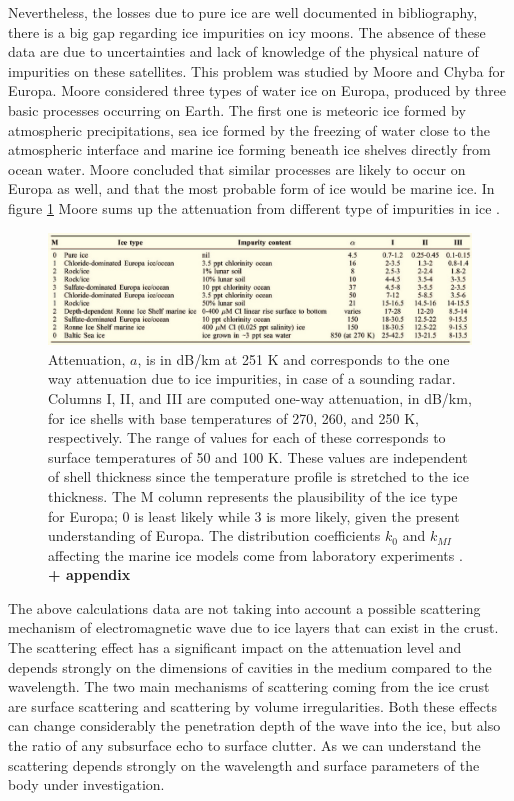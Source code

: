 Nevertheless, the losses due to pure ice are well documented in bibliography, there is a big gap regarding ice impurities on icy moons. The absence of these data are due to uncertainties and lack of knowledge of the physical nature of impurities on these satellites. This problem was studied by  Moore \cite{Moore_2000} and Chyba \cite{Chyba_1998} for Europa. Moore considered three types of water ice on Europa, produced by three basic processes occurring on Earth. The first one is meteoric ice formed by atmospheric precipitations, sea ice formed by the freezing of water close to the atmospheric interface and marine ice forming beneath ice shelves directly from ocean water. Moore concluded that similar processes are likely to occur on Europa as well, and that the most probable form of ice would be marine ice. In figure \ref{impurities} Moore sums up the attenuation from different type of impurities in ice \cite{Moore_2000}.

\begin{figure}[ht]
\centering
\label{impurities}
\includegraphics[width=1\textwidth]{figures/Moore2.jpg}
\caption{Attenuation, $a$, is in dB/km at 251 K and corresponds to the one way attenuation due to  ice impurities, in case of a sounding radar. Columns I, II, and III are computed one-way attenuation, in dB/km, for ice shells with base temperatures of 270, 260, and 250 K, respectively. The range of values for each of these corresponds to surface temperatures of 50 and 100 K. These values are independent of shell thickness since the temperature profile is stretched to the ice thickness. The M column represents the plausibility of the ice type for Europa; 0 is least likely while 3 is more likely, given the present understanding
of Europa. The distribution coefficients $k_{0}$ and $k_{MI}$ affecting the marine ice models come from laboratory experiments \cite{Moore_2000}. \textbf{+ appendix}}
\end{figure}
The above calculations data are not taking into account a possible scattering mechanism of electromagnetic wave due to ice layers that can exist in the crust. The scattering effect has a significant impact on the attenuation level and depends strongly on the dimensions of cavities in the medium compared to the wavelength. The two main mechanisms of scattering coming from the ice crust are surface scattering and scattering by volume irregularities. Both these effects can change considerably the penetration depth of the wave into the ice, but also the ratio of any subsurface echo to surface clutter. As we can understand the scattering depends strongly on the wavelength and surface parameters of the body under investigation. 

